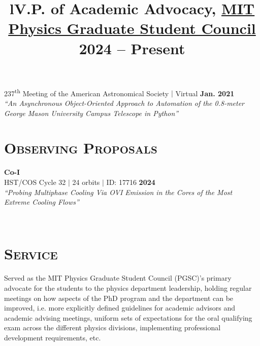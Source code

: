 \documentclass[marg, centered]{res}
\begin{document}
\begin{resume}
\begin{etaremune}[itemindent=0pt, leftmargin=19pt]
\item 237\textsuperscript{th} Meeting of the American Astronomical Society $|$ Virtual \hfill \textbf{Jan. 2021}\\
{} \textit{``An Asynchronous Object-Oriented Approach to Automation of the 0.8-meter George Mason University Campus Telescope in Python''}

\end{etaremune}


\section{{\scshape \bfseries Observing Proposals}}
\textbf{Co-I} \\
HST/COS Cycle 32 $|$ 24 orbits $|$ ID: 17716 \hfill \textbf{2024} \\
\textit{``Probing Multiphase Cooling Via OVI Emission in the Cores of the Most Extreme Cooling Flows''}


\begin{format}
\title{l} \\
\body
\end{format}

\section{{\scshape \bfseries Service}}

\title{\textbf{V.P. of Academic Advocacy}, \href{https://physics-gsc.scripts.mit.edu/home/}{\color{dkbu} MIT Physics Graduate Student Council} \hfill \textbf{2024 -- Present}}
\begin{position}
{\small Served as the MIT Physics Graduate Student Council (PGSC)'s primary advocate for the students to the physics department leadership, holding regular meetings on how aspects of the PhD program and the department can be improved, i.e. more explicitly defined guidelines for academic advisors and academic advising meetings, uniform sets of expectations for the oral qualifying exam across the different physics divisions, implementing professional development requirements, etc.}
\end{position}


\end{resume}
\end{document}
